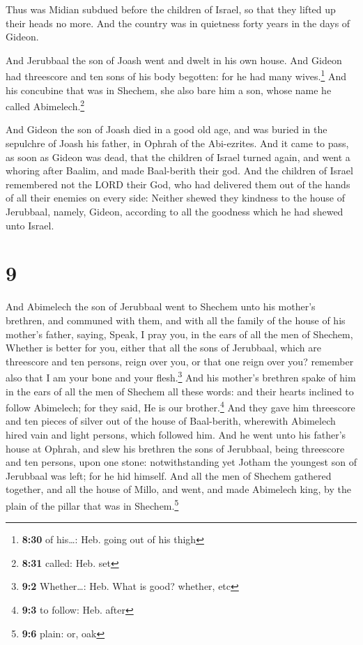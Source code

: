  Thus was Midian subdued before the children of Israel,
so that they lifted up their heads no more. And the country was in
quietness forty years in the days of Gideon.

 And Jerubbaal the son of Joash went and dwelt in his own
house.  And Gideon had threescore and ten sons of his
body begotten: for he had many wives.\footnote{\textbf{8:30} of
  his\ldots: Heb. going out of his thigh}  And his
concubine that was in Shechem, she also bare him a son, whose name he
called Abimelech.\footnote{\textbf{8:31} called: Heb. set}

 And Gideon the son of Joash died in a good old age, and
was buried in the sepulchre of Joash his father, in Ophrah of the
Abi-ezrites.  And it came to pass, as soon as Gideon was
dead, that the children of Israel turned again, and went a whoring after
Baalim, and made Baal-berith their god.  And the children
of Israel remembered not the LORD their God, who had delivered them out
of the hands of all their enemies on every side:  Neither
shewed they kindness to the house of Jerubbaal, namely, Gideon,
according to all the goodness which he had shewed unto Israel.

\hypertarget{section-8}{%
\section{9}\label{section-8}}

 And Abimelech the son of Jerubbaal went to Shechem unto
his mother's brethren, and communed with them, and with all the family
of the house of his mother's father, saying,  Speak, I
pray you, in the ears of all the men of Shechem, Whether is better for
you, either that all the sons of Jerubbaal, which are threescore and ten
persons, reign over you, or that one reign over you? remember also that
I am your bone and your flesh.\footnote{\textbf{9:2} Whether\ldots: Heb.
  What is good? whether, etc}  And his mother's brethren
spake of him in the ears of all the men of Shechem all these words: and
their hearts inclined to follow Abimelech; for they said, He is our
brother.\footnote{\textbf{9:3} to follow: Heb. after}  And
they gave him threescore and ten pieces of silver out of the house of
Baal-berith, wherewith Abimelech hired vain and light persons, which
followed him.  And he went unto his father's house at
Ophrah, and slew his brethren the sons of Jerubbaal, being threescore
and ten persons, upon one stone: notwithstanding yet Jotham the youngest
son of Jerubbaal was left; for he hid himself.  And all
the men of Shechem gathered together, and all the house of Millo, and
went, and made Abimelech king, by the plain of the pillar that was in
Shechem.\footnote{\textbf{9:6} plain: or, oak}

